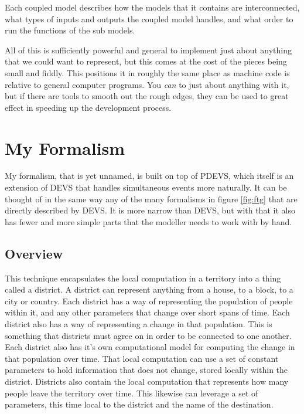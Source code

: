\documentclass[twocolumn]{article}
\begin{document}
Each coupled model describes how the models that it contains are interconnected, what types of inputs and outputs the coupled model handles, and what order to run the functions of the sub models.

All of this is sufficiently powerful and general to implement just about anything that we could want to represent, but this comes at the cost of the pieces being small and fiddly. This positions it in roughly the same place as machine code is relative to general computer programs. You \textit{can} to just about anything with it, but if there are tools to smooth out the rough edges, they can be used to great effect in speeding up the development process.

\section{My Formalism}

My formalism, that is yet unnamed, is built on top of PDEVS, which itself is an extension of DEVS that handles simultaneous events more naturally. It can be thought of in the same way any of the many formalisms in figure \ref{fig:ftg} that are directly described by DEVS. It is more narrow than DEVS, but with that it also has fewer and more simple parts that the modeller needs to work with by hand.

\subsection{Overview}

This technique encapsulates the local computation in a territory into a thing called a district. 
A district can represent anything from a house, to a block, to a city or country.
Each district has a way of representing the population of people within it, and any other parameters that change over short spans of time.
Each district also has a way of representing a change in that population. This is something that districts must agree on in order to be connected to one another.
Each district also has it's own computational model for computing the change in that population over time. 
That local computation can use a set of constant parameters to hold information that does not change, stored locally within the district.
Districts also contain the local computation that represents how many people leave the territory over time. This likewise can leverage a set of parameters, this time local to the district and the name of the destination.
\end{document}
